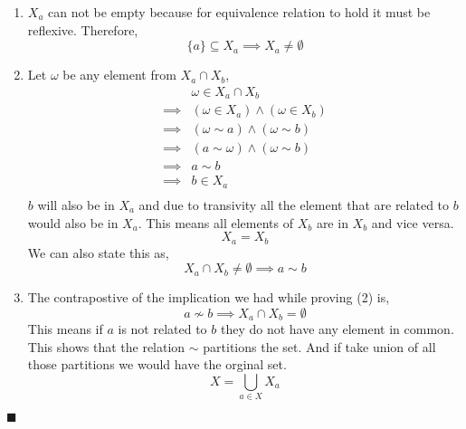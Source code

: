 \documentclass{exam}
\theoremstyle{mytheoremstyle}
\theoremstyle{mytheoremstyle}
\theoremstyle{myproblemstyle}
\begin{document}
\begin{questions}
\begin{parts}
		\begin{solution}
			\begin{enumerate}
				\item \(X_{a}\) can not be empty because for equivalence relation to hold it must be reflexive. Therefore,
				      \[\{a\}\subseteq X_{a}\implies X_{a}\neq\emptyset\]
				\item Let \(\omega\) be any element from \(X_{a}\cap X_{b}\),
				      \begin{align*}
					               & \omega\in X_{a}\cap X_{b}                \\
					      \implies & (\omega\in X_{a})\land (\omega\in X_{b}) \\
					      \implies & (\omega\sim a) \land (\omega\sim b)      \\
					      \implies & (a\sim \omega) \land (\omega\sim b)      \\
					      \implies & a\sim b
					      \\
					      \implies & b\in X_{a}                               \\
				      \end{align*}
				      \(b\) will also be in \(X_{a}\) and due to transivity all the element that are related to \(b\) would also be in \(X_{a}\). This means all elements of \(X_{b}\) are in \(X_{b}\) and vice versa.
				      \[X_{a}=X_{b}\]
				      We can also state this as,
				      \[X_{a}\cap X_{b}\neq\emptyset\implies a\sim b\]
				\item The contrapostive of the implication we had while proving (2) is,
				      \[a\nsim b \implies X_{a}\cap X_{b}=\emptyset\]
				      This means if \(a\) is not related to \(b\) they do not have any element in common. This shows that the relation \(\sim\) partitions the set. And if take union of all those partitions we would have the orginal set.
				      \[X=\bigcup_{a\in X}X_{a}\]
			\end{enumerate}
			\center \(\blacksquare\)
		\end{solution}
	\end{parts}
\end{questions}
\end{document}
